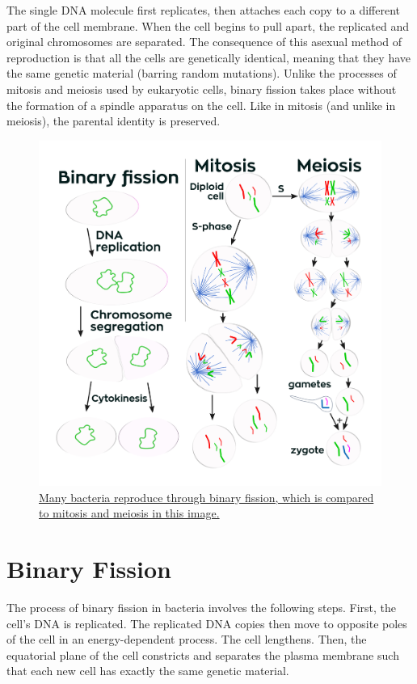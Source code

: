 The single DNA molecule first replicates, then attaches each copy to a different part of the cell membrane. When the cell begins to pull apart, the replicated and original chromosomes are separated. The consequence of this asexual method of reproduction is that all the cells are genetically identical, meaning that they have the same genetic material (barring random mutations). Unlike the processes of mitosis and meiosis used by eukaryotic cells, binary fission takes place without the formation of a spindle apparatus on the cell. Like in mitosis (and unlike in meiosis), the parental identity is preserved.



\begin{figure}

{\centering \includegraphics[width=0.7\linewidth]{./figures/cellcycle/Three_cell_growth_types} 

}

\caption{\href{https://commons.wikimedia.org/wiki/File:Three_cell_growth_types.svg}{Many bacteria reproduce through binary fission, which is compared to mitosis and meiosis in this image.}}\label{fig:celldivision}
\end{figure}

\hypertarget{binary-fission}{%
\section{Binary Fission}\label{binary-fission}}

The process of binary fission in bacteria involves the following steps. First, the cell's DNA is replicated. The replicated DNA copies then move to opposite poles of the cell in an energy-dependent process. The cell lengthens. Then, the equatorial plane of the cell constricts and separates the plasma membrane such that each new cell has exactly the same genetic material.

